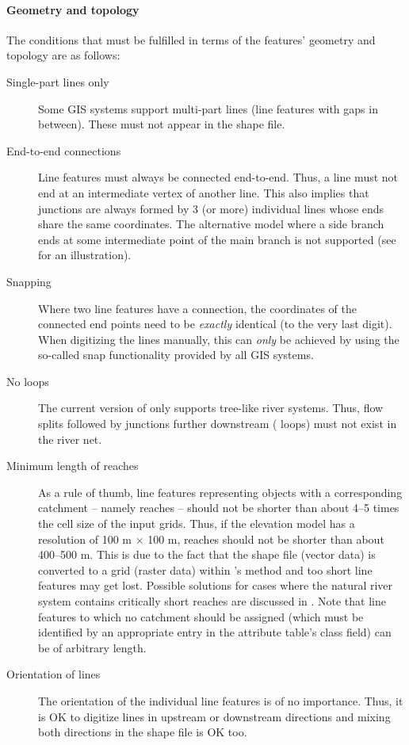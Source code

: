 \paragraph{Geometry and topology}
The conditions that must be fulfilled in terms of the features' geometry and topology are as follows:
\begin{description}
  \item [Single-part lines only] Some GIS systems support multi-part lines (line features with gaps in between). These must not appear in the shape file.
  \item [End-to-end connections] Line features must always be connected end-to-end. Thus, a line must not end at an intermediate vertex of another line. This also implies that junctions are always formed by 3 (or more) individual lines whose ends share the same coordinates. The alternative model where a side branch ends at some intermediate point of the main branch is not supported (see  for an illustration).
  \item [Snapping] Where two line features have a connection, the coordinates of the connected end points need to be \emph{exactly} identical (to the very last digit). When digitizing the lines manually, this can \emph{only} be achieved by using the so-called snap functionality provided by all GIS systems.
  \item [No loops] The current version of  only supports tree-like river systems. Thus, flow splits followed by junctions further downstream (\ie{} loops) must not exist in the river net.
  \item [Minimum length of reaches] As a rule of thumb, line features representing objects with a corresponding catchment -- namely reaches -- should not be shorter than about 4--5 times the cell size of the input grids. Thus, if the elevation model has a resolution of 100 m $\times$ 100 m, reaches should not be shorter than about 400--500 m. This is due to the fact that the shape file (vector data) is converted to a grid (raster data) within 's  method and too short line features may get lost. Possible solutions for cases where the natural river system contains critically short reaches are discussed in . Note that line features to which no catchment should be assigned (which must be identified by an appropriate entry in the attribute table's class field) can be of arbitrary length.
  \item [Orientation of lines] The orientation of the individual line features is of no importance. Thus, it is OK to digitize lines in upstream or downstream directions and mixing both directions in the shape file is OK too.
\end{description}

